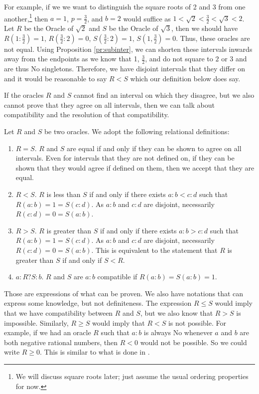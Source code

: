 \documentclass[12pt]{article}
\begin{document}
For example, if we we want to distinguish the square roots of 2 and 3 from one another,\footnote{We will discuss square roots later; just assume the usual ordering properties for now.} then $a = 1$, $p = \tfrac{3}{2}$, and $b = 2$ would suffice as $1 < \sqrt{2} < \tfrac{3}{2} < \sqrt{3} < 2$. Let $R$ be the Oracle of $\sqrt{2}$ and $S$ be the Oracle of $\sqrt{3}$, then we should have $R(1:\tfrac{3}{2}) = 1$, $R(\tfrac{3}{2}:2) = 0$,  $S(\tfrac{3}{2}:2) = 1$, $S(1, \tfrac{3}{2}) = 0$. Thus, these oracles are not equal. Using Proposition \ref{pr:subinter}, we can shorten these intervals inwards away from the endpoints as we know that 1, $\frac{3}{2}$, and do not square to $2$ or $3$ and are thus No singletons. Therefore, we have disjoint intervals that they differ on and it would be reasonable to say $R < S$ which our definition below does say. 

If the oracles $R$ and $S$ cannot find an interval on which they disagree, but we also cannot prove that they agree on all intervals, then we can talk about compatibility and the resolution of that compatibility.

Let $R$ and $S$ be two oracles. We adopt the following relational definitions:

\begin{enumerate}
    \item $R=S$. $R$ and $S$ are equal if and only if they can be shown to agree on all intervals. Even for intervals that they are not defined on, if they can be shown that they would agree if defined on them, then we accept that they are equal. 
    \item $R < S$. $R$ is less than $S$ if and only if there exists $a:b < c:d$ such that $R(a:b) =1 = S(c:d)$. As $a:b$ and $c:d$ are disjoint, necessarily $R(c:d) = 0 = S(a:b)$. 
    \item $R > S$. $R$ is greater than $S$ if and only if there exists $a:b > c:d$ such that $R(a:b) =1 = S(c:d)$. As $a:b$ and $c:d$ are disjoint, necessarily $R(c:d) = 0 = S(a:b)$. This is equivalent to the statement that $R$ is greater than $S$ if and only if $S < R$. 
    \item $a:R?S:b$. $R$ and $S$ are $a:b$ compatible if $R(a:b)=S(a:b) = 1$. 
\end{enumerate}

Those are expressions of what can be proven. We also have notations that can express some knowledge, but not definiteness. The expression $R \leq S$ would imply that we have compatibility between $R$ and $S$, but we also know that $R > S$ is impossible. Similarly, $R \geq S$ would imply that $R < S$ is not possible. For example, if we had an oracle $R$ such that $a:b$ is always No whenever $a$ and $b$ are both negative rational numbers, then $R < 0$ would not be possible. So we could write $R \geq 0$. This is similar to what is done in \cite{bridger}.
\end{document}
